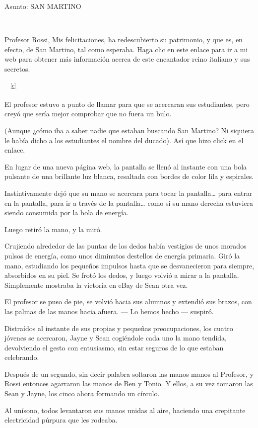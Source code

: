 Asunto: SAN MARTINO~

~

Profesor Rossi, Mis felicitaciones, ha redescubierto su patrimonio, y
que es, en efecto, de San Martino, tal como esperaba. Haga clic en este
enlace para ir a mi web para obtener más información acerca de este
encantador reino italiano y sus secretos.

~ \textsuperscript{\hyperref[cmnt3]{{[}c{]}}}

El profesor estuvo a punto de llamar para que se acercaran sus
estudiantes, pero creyó que sería mejor comprobar que no fuera un bulo.

(Aunque ¿cómo iba a saber nadie que estaban buscando San Martino? Ni
siquiera le había dicho a los estudiantes el nombre del ducado). Así que
hizo click en el enlace.

En lugar de una nueva página web, la pantalla se llenó al instante con
una bola pulsante de una brillante luz blanca, resaltada con bordes de
color lila y espirales.

Instintivamente dejó que su mano se acercara para tocar la
pantalla\ldots{} para entrar en la pantalla, para ir a través de la
pantalla\ldots{} como si su mano derecha estuviera siendo consumida por
la bola de energía.

Luego retiró la mano, y la miró.

Crujiendo alrededor de las puntas de los dedos había vestigios de unos
morados pulsos de energía, como unos diminutos destellos de energía
primaria. Giró la mano, estudiando los pequeños impulsos hasta que se
desvanecieron para siempre, absorbidos en su piel. Se frotó los dedos, y
luego volvió a mirar a la pantalla. Simplemente mostraba la victoria en
eBay de Sean otra vez.

El profesor se puso de pie, se volvió hacia sus alumnos y extendió sus
brazos, con las palmas de las manos hacia afuera. --- Lo hemos hecho ---
suspiró.

Distraídos al instante de sus propias y pequeñas preocupaciones, los
cuatro jóvenes se acercaron, Jayne y Sean cogiéndole cada uno la mano
tendida, devolviendo el gesto con entusiasmo, sin estar seguros de lo
que estaban celebrando.

Después de un segundo, sin decir palabra soltaron las manos manos al
Profesor, y Rossi entonces agarraron las manos de Ben y Tonio. Y ellos,
a su vez tomaron las Sean y Jayne, los cinco ahora formando un círculo.

Al unísono, todos levantaron sus manos unidas al aire, haciendo una
crepitante electricidad púrpura que les rodeaba.

